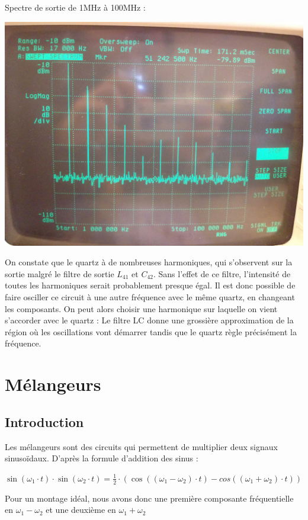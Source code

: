 \documentclass{article}
\begin{document}
Spectre de sortie de 1MHz à 100MHz :\\
\begin{center}
\includegraphics[width = 0.7\linewidth]{7_3_6_1MHz_100MHz.jpg}
\end{center}

On constate que le quartz à de nombreuses harmoniques, qui s'observent sur la sortie malgré le filtre de sortie $L_{41}$ et $C_{42}$. Sans l'effet de ce filtre, l'intensité de toutes les harmoniques serait probablement presque égal. Il est donc possible de faire osciller ce circuit à une autre fréquence avec le même quartz, en changeant les composants. On peut alors choisir une harmonique sur laquelle on vient s'accorder avec le quartz : Le filtre LC donne une grossière approximation de la région où les oscillations vont démarrer tandis que le quartz règle précisément la fréquence.


\section{Mélangeurs}

\subsection{Introduction}
Les mélangeurs sont des circuits qui permettent de multiplier deux signaux sinusoïdaux.
D'après la formule d'addition des sinus :
\begin{center}
$\sin(\omega_{1}\cdot t)\cdot \sin(\omega_{2}\cdot t) = \frac{1}{2}\cdot(\cos((\omega_{1} - \omega_{2})\cdot t) - cos((\omega_{1} + \omega_{2})\cdot t ) )$
\end{center}

Pour un montage idéal, nous avons donc une première composante fréquentielle en $\omega_{1} - \omega_{2}$ et une deuxième en $\omega_{1} + \omega_{2}$
\end{document}
